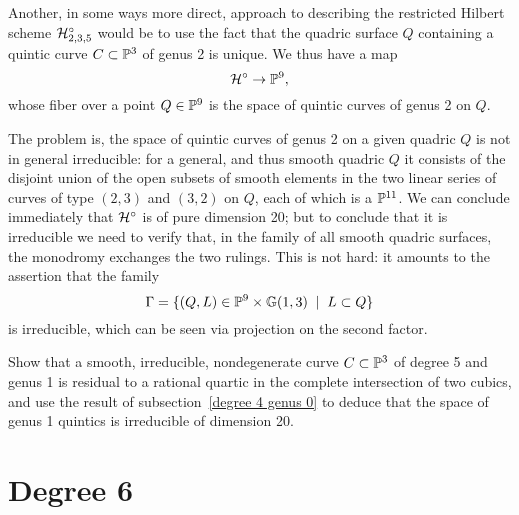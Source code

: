 Another, in some ways more direct, approach to describing the restricted Hilbert scheme $\cH^\circ_{2,3,5}$ would be to use the fact that the quadric surface $Q$ containing a quintic curve $C \subset \PP^3$ of genus 2 is unique. We thus have a map
$$
\cH^\circ \to \PP^9,
$$
whose fiber over a point $Q \in \PP^9$ is the space of quintic curves of genus 2 on $Q$. 

The problem is, the space of quintic curves of genus 2 on a given quadric $Q$ is not in general irreducible: for a general, and thus smooth quadric $Q$ it consists of the disjoint union of the open subsets of smooth elements in the two linear series of curves of type $(2,3)$ and $(3,2)$ on $Q$, each of which is a $\PP^{11}$. We can conclude immediately that $\cH^\circ$ is of pure dimension 20; but to conclude that it is irreducible we need to verify that, in the family of all smooth quadric surfaces, the monodromy exchanges the two rulings.  This is not hard: it amounts to the assertion that the family
$$
\Gamma = \{ (Q,L) \in \PP^9 \times \GG(1,3) \; \mid \; L \subset Q \}
$$
is irreducible, which can be seen via projection on the second factor.


\begin{exercise}
Show that a smooth, irreducible, nondegenerate curve $C \subset \PP^3$ of degree 5 and genus 1 is residual to a rational quartic in the complete intersection of two cubics, and use the result of subsection~\ref{degree 4 genus 0} to deduce that the space of genus 1 quintics is irreducible of dimension 20.
\end{exercise}

\section{Degree 6}

